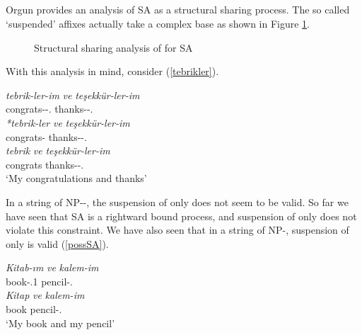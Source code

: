 \subsection{\cite{orgun1995flat}} \label{orgun}

Orgun provides an analysis of SA as a structural sharing process. The so called `suspended' affixes actually take a complex base as shown in Figure \ref{fig:orgun}.

\begin{figure}[hbt!]
    \centering
    \caption{Structural sharing analysis of \cite{orgun1995flat} for SA}
    \label{fig:orgun}
\end{figure}

With this analysis in mind, consider (\ref{tebrikler}). 
\begin{exe}
    \ex \label{tebrikler}
    \begin{xlist}
    \ex 
    \gll 
    \textit{tebrik-ler-im} \textit{ve} \textit{teşekkür-ler-im} \\ congrats-{\Pl}-{\First}{\Sg}.{\Poss} {\And} thanks-{\Pl}-{\First}{\Sg}.{\Poss} \\
    
    \ex \label{tebriklerug}
    \gll
    \textit{*tebrik-ler} \textit{ve} \textit{teşekkür-ler-im} \\ congrats-{\Pl} {\And} thanks-{\Pl}-{\First}{\Sg}.{\Poss} \\
    
    \ex \label{tebriklerg}
    \gll 
    \textit{tebrik} \textit{ve} \textit{teşekkür-ler-im} \\ congrats {\And} thanks-{\Pl}-{\First}{\Sg}.{\Poss} \\
    \glt `My congratulations and thanks'
    \end{xlist}
\end{exe}

In a string of NP-{\Pl}-{\Poss}, the suspension of only {\Poss} does not seem to be valid. So far we have seen that SA is a rightward bound process, and suspension of only {\Poss} does not violate this constraint. We have also seen that in a string of NP-{\Poss}, suspension of only {\Poss} is valid (\ref{possSA}).

\begin{exe}
    \ex \label{possSA}
    \begin{xlist}
        \ex 
        \gll 
        \textit{Kitab-ım} \textit{ve} \textit{kalem-im} \\ book-{\Poss}.1{\Sg} {\And} pencil-{\First}{\Sg}.{\Poss} \\
        
        \ex 
        \gll 
        \textit{Kitap} \textit{ve} \textit{kalem-im} \\ book {\And} pencil-{\First}{\Sg}.{\Poss} \\
        \glt `My book and my pencil'
    \end{xlist}
\end{exe}

